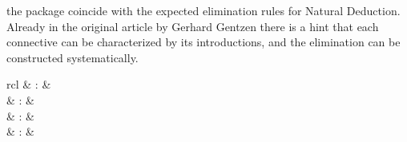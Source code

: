 \begin{isabellebody}
\begin{isamarkuptext}
  the \hyperlink{command.inductive}{\mbox{}} package coincide with the expected
  elimination rules for Natural Deduction.  Already in the original
  article by Gerhard Gentzen \cite{Gentzen:1935} there is a hint that
  each connective can be characterized by its introductions, and the
  elimination can be constructed systematically.%
\end{isamarkuptext}%
\isamarkuptrue%
%
\isamarkuptrue%
%
\begin{isamarkuptext}%
\begin{matharray}{rcl}
    \hypertarget{command.HOL.primrec}{\hyperlink{command.HOL.primrec}{\mbox{}}} & : &  \\
    \hypertarget{command.HOL.fun}{\hyperlink{command.HOL.fun}{\mbox{}}} & : &  \\
    \hypertarget{command.HOL.function}{\hyperlink{command.HOL.function}{\mbox{}}} & : &  \\
    \hypertarget{command.HOL.termination}{\hyperlink{command.HOL.termination}{\mbox{}}} & : &  \\
  \end{matharray}


\end{isamarkuptext}
\end{isabellebody}
